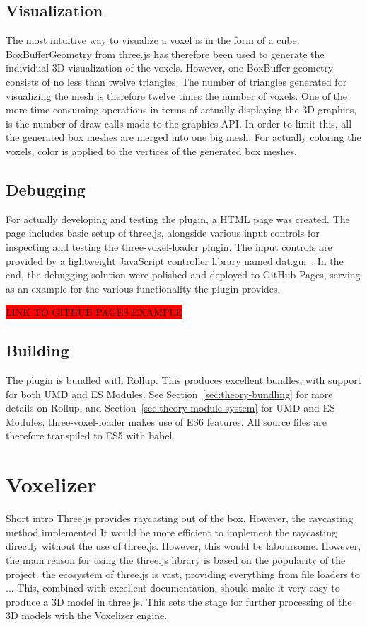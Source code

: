 \subsection{Visualization}
The most intuitive way to visualize a voxel is in the form of a cube. BoxBufferGeometry from three.js has therefore been used to generate the individual 3D visualization of the voxels. However, one BoxBuffer geometry consists of no less than twelve triangles. The number of triangles generated for visualizing the mesh is therefore twelve times the number of voxels. One of the more time consuming operations in terms of actually displaying the 3D graphics, is the number of draw calls made to the graphics API. In order to limit this, all the generated box meshes are merged into one big mesh. For actually coloring the voxels, color is applied to the vertices of the generated box meshes.

\subsection{Debugging}
For actually developing and testing the plugin, a HTML page was created. The page includes basic setup of three.js, alongside various input controls for inspecting and testing the three-voxel-loader plugin. The input controls are provided by a lightweight JavaScript controller library named dat.gui~\cite{dat.gui}. In the end, the debugging solution were polished and deployed to GitHub Pages, serving as an example for the various functionality the plugin provides.

\colorbox{red}{LINK TO GITHUB PAGES EXAMPLE}

\subsection{Building}
The plugin is bundled with Rollup. This produces excellent bundles, with support for both UMD and ES Modules. See Section~\ref{sec:theory-bundling} for more details on Rollup, and Section~\ref{sec:theory-module-system} for UMD and ES Modules. three-voxel-loader makes use of ES6 features. All source files are therefore transpiled to ES5 with babel.

\section{Voxelizer}
Short intro
Three.js provides raycasting out  of the box. However, the raycasting method implemented It would be more efficient to implement the raycasting directly without the use of three.js. However, this would be laboursome. However, the main reason for using the three.js library is based on the popularity of the project. the ecosystem of three.js is vast, providing everything from file loaders to ... This, combined with excellent documentation, should make it very easy to produce a 3D model in three.js. This sets the stage for further processing of the 3D models with the Voxelizer engine.

